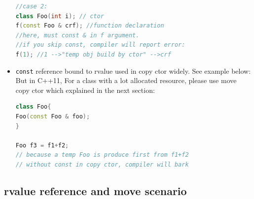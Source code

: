 \documentclass[a4paper,12pt,twoside]{book}
\begin{document}
\begin{itemize}
\begin{lstlisting}[frame=single, language=c++]
//case 2:
class Foo(int i); // ctor
f(const Foo & crf); //function declaration
//here, must const & in f argument.
//if you skip const, compiler will report error:
f(1); //1 -->"temp obj build by ctor" -->crf
\end{lstlisting}

\item \texttt{const} reference bound to rvalue used in copy ctor widely. See example below: But in C++11, For a class with a lot allocated resource, please use move copy ctor which explained in the next section:

\begin{lstlisting}[frame=single, language=c++]
class Foo{
Foo(const Foo & foo);
}

Foo f3 = f1+f2;
// because a temp Foo is produce first from f1+f2
// without const in copy ctor, compiler will bark
\end{lstlisting}
\end{itemize}

\subsection{rvalue reference and move scenario}
\end{document}
